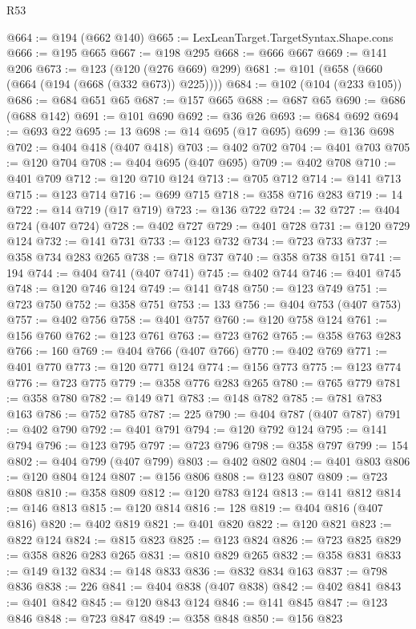 \begin{lexlean}{R53}
\begin{coremodule}
@664 := @194 (@662 @140)
@665 := LexLeanTarget.TargetSyntax.Shape.cons
@666 := @195 @665
@667 := @198 @295
@668 := @666 @667
@669 := @141 @206
@673 := @123 (@120 (@276 @669) @299)
@681 := @101 (@658 (@660 (@664 (@194 (@668 (@332 @673)) @225))))
@684 := @102 (@104 (@233 @105))
@686 := @684 @651 @65
@687 := @157 @665
@688 := @687 @65
@690 := @686 (@688 @142)
@691 := @101 @690
@692 := @36 @26
@693 := @684 @692
@694 := @693 @22
@695 := 13
@698 := @14 @695 (@17 @695)
@699 := @136 @698
@702 := @404 @418 (@407 @418)
@703 := @402 @702
@704 := @401 @703
@705 := @120 @704
@708 := @404 @695 (@407 @695)
@709 := @402 @708
@710 := @401 @709
@712 := @120 @710 @124
@713 := @705 @712
@714 := @141 @713
@715 := @123 @714
@716 := @699 @715
@718 := @358 @716 @283
@719 := 14
@722 := @14 @719 (@17 @719)
@723 := @136 @722
@724 := 32
@727 := @404 @724 (@407 @724)
@728 := @402 @727
@729 := @401 @728
@731 := @120 @729 @124
@732 := @141 @731
@733 := @123 @732
@734 := @723 @733
@737 := @358 @734 @283 @265
@738 := @718 @737
@740 := @358 @738 @151
@741 := 194
@744 := @404 @741 (@407 @741)
@745 := @402 @744
@746 := @401 @745
@748 := @120 @746 @124
@749 := @141 @748
@750 := @123 @749
@751 := @723 @750
@752 := @358 @751
@753 := 133
@756 := @404 @753 (@407 @753)
@757 := @402 @756
@758 := @401 @757
@760 := @120 @758 @124
@761 := @156 @760
@762 := @123 @761
@763 := @723 @762
@765 := @358 @763 @283
@766 := 160
@769 := @404 @766 (@407 @766)
@770 := @402 @769
@771 := @401 @770
@773 := @120 @771 @124
@774 := @156 @773
@775 := @123 @774
@776 := @723 @775
@779 := @358 @776 @283 @265
@780 := @765 @779
@781 := @358 @780
@782 := @149 @71
@783 := @148 @782
@785 := @781 @783 @163
@786 := @752 @785
@787 := 225
@790 := @404 @787 (@407 @787)
@791 := @402 @790
@792 := @401 @791
@794 := @120 @792 @124
@795 := @141 @794
@796 := @123 @795
@797 := @723 @796
@798 := @358 @797
@799 := 154
@802 := @404 @799 (@407 @799)
@803 := @402 @802
@804 := @401 @803
@806 := @120 @804 @124
@807 := @156 @806
@808 := @123 @807
@809 := @723 @808
@810 := @358 @809
@812 := @120 @783 @124
@813 := @141 @812
@814 := @146 @813
@815 := @120 @814
@816 := 128
@819 := @404 @816 (@407 @816)
@820 := @402 @819
@821 := @401 @820
@822 := @120 @821
@823 := @822 @124
@824 := @815 @823
@825 := @123 @824
@826 := @723 @825
@829 := @358 @826 @283 @265
@831 := @810 @829 @265
@832 := @358 @831
@833 := @149 @132
@834 := @148 @833
@836 := @832 @834 @163
@837 := @798 @836
@838 := 226
@841 := @404 @838 (@407 @838)
@842 := @402 @841
@843 := @401 @842
@845 := @120 @843 @124
@846 := @141 @845
@847 := @123 @846
@848 := @723 @847
@849 := @358 @848
@850 := @156 @823

\end{coremodule}
\end{lexlean}
